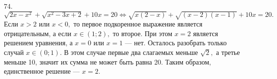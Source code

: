 74. $\sqrt{2x-x^2}+\sqrt{x^2-3x+2}+10x=20\Leftrightarrow \sqrt{x(2-x)}+\sqrt{(x-2)(x-1)}+10x=20.$ Если $x>2$ или $x<0,$ то первое подкоренное выражение является отрицательным, а если $x\in (1;2),$ то второе. При этом $x=2$ является решением уравнения, а  $x=0$ или $x=1$ --- нет. Осталось разобрать только случай $x\in(0;1).$ В этом случае первые два слагаемых меньше $\sqrt{2},$ а третье меньше 10, значит их сумма не может быть равна 20. Таким образом, единственное решение --- $x=2.$\\

